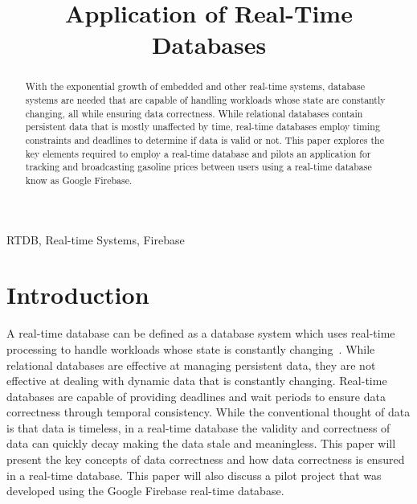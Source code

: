 \documentclass[conference]{IEEEtran}
\begin{document}
\title{Application of Real-Time Databases}

\author{
\and
{}
\and
{}
}

\maketitle

\begin{abstract}
With the exponential growth of embedded and other real-time systems, database systems are needed that are capable of handling workloads whose state are constantly changing, all while ensuring data correctness.  While relational databases contain persistent data that is mostly unaffected by time, real-time databases employ timing constraints and deadlines to determine if data is valid or not. This paper explores the key elements required to employ a real-time database and pilots an application for tracking and broadcasting gasoline prices between users using a real-time database know as Google Firebase.
 
\end{abstract}

\begin{IEEEkeywords}
RTDB, Real-time Systems, Firebase
\end{IEEEkeywords}

\section{Introduction}
A real-time database can be defined as a database system which uses real-time processing to handle workloads whose state is constantly changing~\cite{Buchmann}.  While relational databases are effective at managing persistent data, they are not effective at dealing with dynamic data that is constantly changing. Real-time databases are capable of providing deadlines and wait periods to ensure data correctness through temporal consistency. While the conventional thought of data is that data  is timeless, in a real-time database the validity and correctness of data can quickly decay making the data stale and meaningless. This paper will present the key concepts of data correctness and how data correctness is ensured in a real-time database. This paper will also discuss a pilot project that was developed using the Google Firebase real-time database.  
\end{document}
